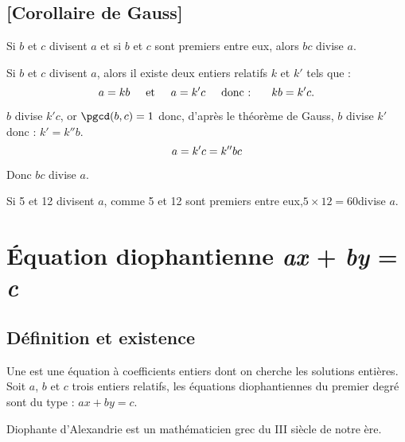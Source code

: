 \subsection{[Corollaire de Gauss]{}}
\begin{propriete}
Si $b$ et $c$ divisent $a$ et si $b$ et $c$ sont premiers entre eux, alors $bc$ divise $a$.
\end{propriete}

\begin{preuve}
  Si $b$ et $c$ divisent $a$, alors il existe deux entiers relatifs
  $k$ et $k'$ tels que :\vspace{-5pt}
$$a=kb\hspace{0.5cm}\text{et}\hspace{0.5cm} a=k'c\hspace{0.5cm}\text{donc : }\hspace{0.5cm} kb=k'c.\vspace{-5pt}$$

$b$ divise $k'c$, or $\pgcd(b,c)=1$ donc, d'après le théorème de
Gauss, $b$ divise $k'$ donc : \enskip $k'=k''b$.\vspace{-5pt}
$$a=k'c=k''bc\vspace{-5pt}$$

Donc $bc$ divise $a$.
\end{preuve}

\begin{exemple*1}
Si 5 et 12 divisent $a$, comme 5 et 12 sont premiers entre eux,\enskip $5\times12=60$\enskip divise $a$.
\end{exemple*1}

\section{Équation diophantienne \textit{ax} + \textit{by} =
  \textit{c}}

\subsection{Définition et existence}
\begin{definition}
  Une  est une équation à
  coefficients entiers dont on cherche les solutions entières. Soit
  $a$, $b$ et $c$ trois entiers relatifs, les équations diophantiennes
  du premier degré sont du type : \enskip $ax+by=c$.
\end{definition}

\begin{remarque}
  Diophante d'Alexandrie est un mathématicien grec du III\ieme{}
  siècle de notre ère.
\end{remarque}

